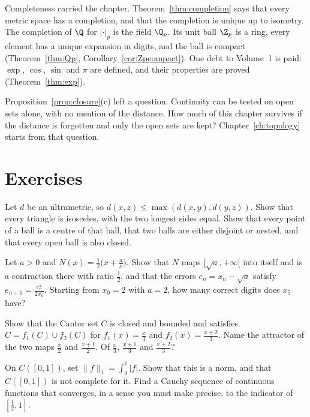 Completeness carried the chapter. Theorem~\ref{thm:completion} says that every metric space has a completion, and that the completion is unique up to isometry. The completion of $\Q$ for $|\cdot|_p$ is the field $\Q_p$. Its unit ball $\Z_p$ is a ring, every element has a unique expansion in digits, and the ball is compact (Theorem~\ref{thm:Qp}, Corollary~\ref{cor:Zpcompact}). One debt to Volume~1 is paid: $\exp$, $\cos$, $\sin$ and $\pi$ are defined, and their properties are proved (Theorem~\ref{thm:exp}).

Proposition~\ref{prop:closure}(c) left a question. Continuity can be tested on open sets alone, with no mention of the distance. How much of this chapter survives if the distance is forgotten and only the open sets are kept? Chapter~\ref{ch:topology} starts from that question.

\section{Exercises}

\begin{exercise}[$\star$]\label{ex:ultra}
Let $d$ be an ultrametric, so $d(x,z)\le\max(d(x,y),d(y,z))$. Show that every triangle is isosceles, with the two longest sides equal. Show that every point of a ball is a centre of that ball, that two balls are either disjoint or nested, and that every open ball is also closed.
\end{exercise}

\begin{exercise}[$\star$]\label{ex:newton}
Let $a>0$ and $N(x)=\frac12\bigl(x+\frac ax\bigr)$. Show that $N$ maps $[\sqrt a,+\infty[$ into itself and is a contraction there with ratio $\frac12$, and that the errors $e_n=x_n-\sqrt a$ satisfy $e_{n+1}=\frac{e_n^2}{2x_n}$. Starting from $x_0=2$ with $a=2$, how many correct digits does $x_5$ have?
\end{exercise}

\begin{exercise}[$\star$]\label{ex:cantorifs}
Show that the Cantor set $C$ is closed and bounded and satisfies $C=f_1(C)\cup f_2(C)$ for $f_1(x)=\frac x3$ and $f_2(x)=\frac{x+2}3$. Name the attractor of the two maps $\frac x2$ and $\frac{x+1}2$. Of $\frac x3$, $\frac{x+1}3$ and $\frac{x+2}3$?
\end{exercise}

\begin{exercise}[$\star\star$]\label{ex:L1incomplete}
On $C([0,1])$, set $\|f\|_1=\int_0^1|f|$. Show that this is a norm, and that $C([0,1])$ is not complete for it. Find a Cauchy sequence of continuous functions that converges, in a sense you must make precise, to the indicator of $[\frac12,1]$.
\end{exercise}

